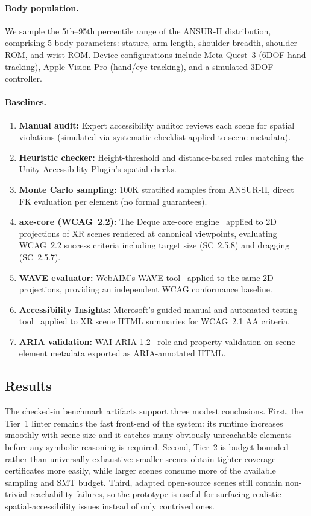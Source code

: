 \documentclass[11pt,letterpaper]{article}
\begin{document}
\paragraph{Body population.}
We sample the 5th--95th percentile range of the ANSUR-II distribution, comprising 5 body parameters: stature, arm length, shoulder breadth, shoulder ROM, and wrist ROM.
Device configurations include Meta Quest~3 (6DOF hand tracking), Apple Vision Pro (hand/eye tracking), and a simulated 3DOF controller.

\paragraph{Baselines.}
\begin{enumerate}[nosep]
  \item \textbf{Manual audit:} Expert accessibility auditor reviews each scene for spatial violations (simulated via systematic checklist applied to scene metadata).
  \item \textbf{Heuristic checker:} Height-threshold and distance-based rules matching the Unity Accessibility Plugin's spatial checks.
  \item \textbf{Monte Carlo sampling:} 100K stratified samples from ANSUR-II, direct FK evaluation per element (no formal guarantees).
  \item \textbf{axe-core (WCAG~2.2):} The Deque axe-core engine~\cite{axe-core} applied to 2D projections of XR scenes rendered at canonical viewpoints, evaluating WCAG~2.2 success criteria including target size (SC~2.5.8) and dragging (SC~2.5.7).
  \item \textbf{WAVE evaluator:} WebAIM's WAVE tool~\cite{wave} applied to the same 2D projections, providing an independent WCAG conformance baseline.
  \item \textbf{Accessibility Insights:} Microsoft's guided-manual and automated testing tool~\cite{a11y-insights} applied to XR scene HTML summaries for WCAG~2.1 AA criteria.
  \item \textbf{ARIA validation:} WAI-ARIA 1.2~\cite{wai-aria} role and property validation on scene-element metadata exported as ARIA-annotated HTML.
\end{enumerate}

\subsection{Results}

The checked-in benchmark artifacts support three modest conclusions.
First, the Tier~1 linter remains the fast front-end of the system: its runtime
increases smoothly with scene size and it catches many obviously unreachable
elements before any symbolic reasoning is required.  Second, Tier~2 is
budget-bounded rather than universally exhaustive: smaller scenes obtain tighter
coverage certificates more easily, while larger scenes consume more of the
available sampling and SMT budget.  Third, adapted open-source scenes still
contain non-trivial reachability failures, so the prototype is useful for
surfacing realistic spatial-accessibility issues instead of only contrived ones.
\end{document}
